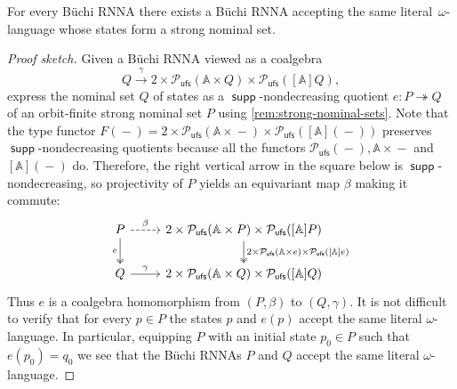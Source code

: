 \documentclass[final,a4paper,UKenglish,thm-restate,autoref,numberwithinsect]{lipics-v2021}
\numberwithin{equation}{section}
\newcommand{\epito}{\twoheadrightarrow}
\newcommand{\xto}[1]{\xrightarrow{~#1~}}
\newcommand{\dash}{\mathop{-}}
\newcommand{\+}[1]{\mathcal{#1}\xspace}
\newcommand{\Pow}{\mathcal{P}}
\newcommand{\ufs}{{\mathsf{ufs}}}
\newcommand{\names}{\mathbb{A}}
\DeclareMathOperator{\supp}{\mathsf{supp}} %
\theoremstyle{definition}
\begin{document}
%
\begin{proposition}\label{prop:strong}
  For every Büchi RNNA there exists a Büchi RNNA accepting the same
  literal~$\omega$-lan\-guage whose states form a strong
  nominal set.
\end{proposition}
%
\begin{proof}[Proof sketch]
 Given a Büchi RNNA viewed as a coalgebra
    \[
      Q\xto{\gamma} 2\times \Pow_\ufs(\names\times Q)\times
      \Pow_\ufs([\names]Q),
    \]
    express the nominal set $Q$ of states as a $\supp$-nondecreasing
    quotient $e\colon P\epito Q$ of an orbit-finite strong nominal set
    $P$ using \autoref{rem:strong-nominal-sets}. Note that the type
    functor
    $F(\dash) = 2\times \Pow_\ufs(\names\times \dash)\times
    \Pow_\ufs([\names](\dash))$ preserves $\supp$-nondecreasing quotients
    because all the functors
    $\Pow_\ufs(\dash), \names\times \dash$ and $[\names](\dash)$
    do. Therefore, the right vertical arrow in the square below is
    $\supp$-nondecreasing, so projectivity of $P$ yields an equivariant
    map $\beta$ making it commute:
\[
      \begin{tikzcd}
        P \ar[d,"e"', two heads] \ar[dashed]{r}{\beta}
        &
        2\times \Pow_\ufs(\names\times P)\times \Pow_\ufs([\names]P)
        \ar[d,"2\times \Pow_\ufs(\names\times e)\times
        \Pow_\ufs({[\names]}e)", two heads]
        \\
        Q \ar[r,"\gamma"]
        &
        2\times \Pow_\ufs(\names\times Q)\times \Pow_\ufs([\names]Q) 
      \end{tikzcd}
\]
    Thus $e$ is a coalgebra homomorphism from $(P,\beta)$ to
    $(Q,\gamma)$. It is not difficult to verify that for every $p\in P$ the states $p$ and $e(p)$ accept the same literal $\omega$-language. In particular, equipping $P$ with an initial state $p_0\in P$  such that $e(p_0)=q_0$ we see that the Büchi RNNAs $P$ and $Q$ accept the same literal $\omega$-language.
\end{proof}
%
\end{document}
